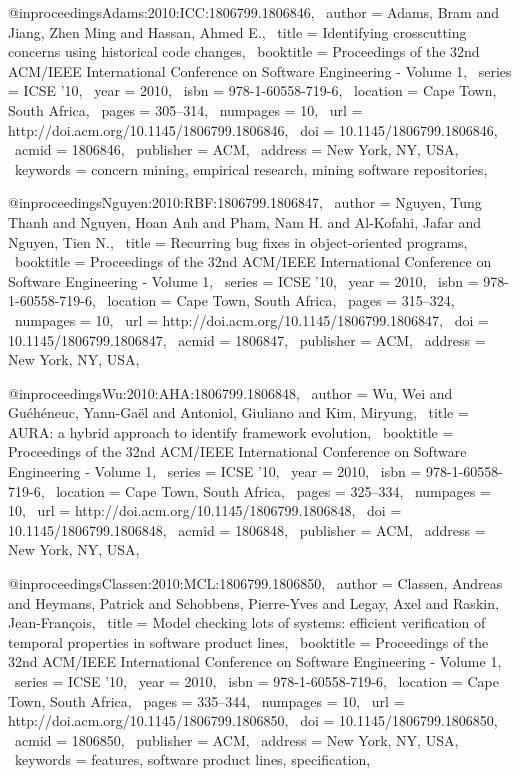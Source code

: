 @inproceedings{Adams:2010:ICC:1806799.1806846,
 author = {Adams, Bram and Jiang, Zhen Ming and Hassan, Ahmed E.},
 title = {Identifying crosscutting concerns using historical code changes},
 booktitle = {Proceedings of the 32nd ACM/IEEE International Conference on Software Engineering - Volume 1},
 series = {ICSE '10},
 year = {2010},
 isbn = {978-1-60558-719-6},
 location = {Cape Town, South Africa},
 pages = {305--314},
 numpages = {10},
 url = {http://doi.acm.org/10.1145/1806799.1806846},
 doi = {10.1145/1806799.1806846},
 acmid = {1806846},
 publisher = {ACM},
 address = {New York, NY, USA},
 keywords = {concern mining, empirical research, mining software repositories},
} 

@inproceedings{Nguyen:2010:RBF:1806799.1806847,
 author = {Nguyen, Tung Thanh and Nguyen, Hoan Anh and Pham, Nam H. and Al-Kofahi, Jafar and Nguyen, Tien N.},
 title = {Recurring bug fixes in object-oriented programs},
 booktitle = {Proceedings of the 32nd ACM/IEEE International Conference on Software Engineering - Volume 1},
 series = {ICSE '10},
 year = {2010},
 isbn = {978-1-60558-719-6},
 location = {Cape Town, South Africa},
 pages = {315--324},
 numpages = {10},
 url = {http://doi.acm.org/10.1145/1806799.1806847},
 doi = {10.1145/1806799.1806847},
 acmid = {1806847},
 publisher = {ACM},
 address = {New York, NY, USA},
} 

@inproceedings{Wu:2010:AHA:1806799.1806848,
 author = {Wu, Wei and Gu{\'e}h{\'e}neuc, Yann-Ga\"{e}l and Antoniol, Giuliano and Kim, Miryung},
 title = {AURA: a hybrid approach to identify framework evolution},
 booktitle = {Proceedings of the 32nd ACM/IEEE International Conference on Software Engineering - Volume 1},
 series = {ICSE '10},
 year = {2010},
 isbn = {978-1-60558-719-6},
 location = {Cape Town, South Africa},
 pages = {325--334},
 numpages = {10},
 url = {http://doi.acm.org/10.1145/1806799.1806848},
 doi = {10.1145/1806799.1806848},
 acmid = {1806848},
 publisher = {ACM},
 address = {New York, NY, USA},
} 

@inproceedings{Classen:2010:MCL:1806799.1806850,
 author = {Classen, Andreas and Heymans, Patrick and Schobbens, Pierre-Yves and Legay, Axel and Raskin, Jean-Fran\c{c}ois},
 title = {Model checking lots of systems: efficient verification of temporal properties in software product lines},
 booktitle = {Proceedings of the 32nd ACM/IEEE International Conference on Software Engineering - Volume 1},
 series = {ICSE '10},
 year = {2010},
 isbn = {978-1-60558-719-6},
 location = {Cape Town, South Africa},
 pages = {335--344},
 numpages = {10},
 url = {http://doi.acm.org/10.1145/1806799.1806850},
 doi = {10.1145/1806799.1806850},
 acmid = {1806850},
 publisher = {ACM},
 address = {New York, NY, USA},
 keywords = {features, software product lines, specification},
} 

